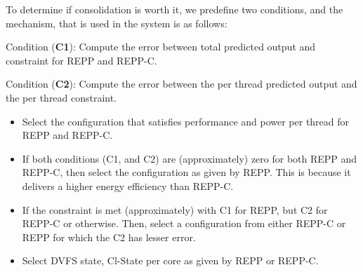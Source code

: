 To determine if consolidation is worth it, we predefine two conditions, and the mechanism,
that is used in the system is as follows:


\textsf{Condition (\textbf{C1}):} Compute the error between total
        predicted output and constraint for REPP and REPP-C.

\textsf{Condition (\textbf{C2}):} Compute the error between the per
        thread predicted output and the per thread constraint.

\begin{itemize}


    \item[{\small \circled{1}}] Select the configuration that satisfies performance and
        power per thread for REPP and REPP-C.



    \item[{\small \circled{2}}] If both conditions (\textsf{C1}, and \textsf{C2}) are
        (approximately) zero for both REPP and REPP-C, then select the configuration as
        given by REPP. This is because it delivers a higher energy efficiency than REPP-C.
        
    \item[{\small \circled{3}}] If the constraint is met (approximately) with \textsf{C1}
        for REPP, but \textsf{C2} for REPP-C or otherwise. Then, select a configuration
        from either REPP-C or REPP for which the \textsf{C2} has lesser error.

    \item[{\small \circled{4}}] Select DVFS state, Cl-State per core as given by REPP or
        REPP-C.
        
\end{itemize}


